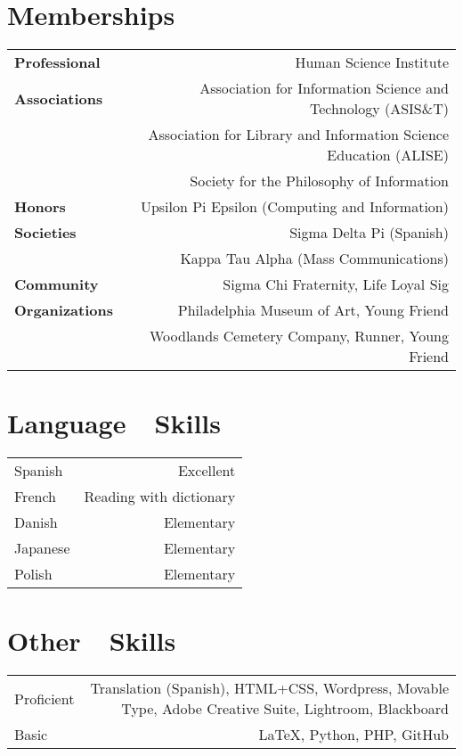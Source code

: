 \documentclass[letterpaper,11pt]{article}
\begin{document}
\section*{Memberships}
\begin{longtable}{ @{} L @{} R @{} }

\textbf{Professional}&Human Science Institute\\
\textbf{Associations}&Association for Information Science and Technology (ASIS\&T)\\
&Association for Library and Information Science Education (ALISE)\\
&Society for the Philosophy of Information\\[1em]

\textbf{Honors}&Upsilon Pi Epsilon (Computing and Information)\\
\textbf{Societies}&Sigma Delta Pi (Spanish)\\
&Kappa Tau Alpha (Mass Communications)\\[1em]

\textbf{Community}&Sigma Chi Fraternity, Life Loyal Sig\\
\textbf{Organizations}&Philadelphia Museum of Art, Young Friend\\
&Woodlands Cemetery Company, Runner, Young Friend\\



\end{longtable}


\section*{Language~~Skills}
\begin{longtable}{ @{} L @{} R @{} }

Spanish		& Excellent\\
French		& Reading with dictionary\\
Danish		& Elementary\\
Japanese	& Elementary\\
Polish		& Elementary

\end{longtable}



\section*{Other~~Skills}
\begin{longtable}{ @{} L @{} R @{} }
	
Proficient	& Translation (Spanish), HTML+CSS, Wordpress, Movable Type, Adobe Creative Suite, Lightroom, Blackboard\\[1em]

Basic & \LaTeX, Python, PHP, GitHub

\end{longtable}
\end{document}
